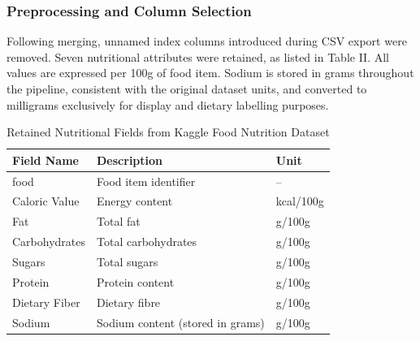 \documentclass[conference]{IEEEtran}
\begin{document}
\subsubsection{Preprocessing and Column Selection}
 Following merging, unnamed index columns introduced during CSV export were removed. Seven nutritional attributes were retained, as listed in Table II. All values are expressed per 100g of food item. Sodium is stored in grams throughout the pipeline, consistent with the original dataset units, and converted to milligrams exclusively for display and dietary labelling purposes.

 \begin{table}[H]
\caption{Retained Nutritional Fields from Kaggle Food Nutrition Dataset}
\label{tab:nutrition_fields}
\centering
\footnotesize
\begin{tabular}{p{1.8cm} p{2.8cm} p{1.4cm}}
\toprule
\textbf{Field Name} & \textbf{Description} & \textbf{Unit} \\
\midrule
food & Food item identifier & -- \\

Caloric Value & Energy content & kcal/100g \\

Fat & Total fat & g/100g \\

Carbohydrates & Total carbohydrates & g/100g \\

Sugars & Total sugars & g/100g \\

Protein & Protein content & g/100g \\

Dietary Fiber & Dietary fibre & g/100g \\

Sodium & Sodium content (stored in grams) & g/100g \\
\bottomrule
\end{tabular}
\end{table}
\end{document}
